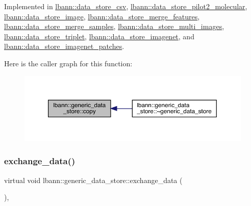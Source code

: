Implemented in \hyperlink{classlbann_1_1data__store__csv_a2e95f53f539a838e6c6484b9f4de5a45}{lbann\+::data\+\_\+store\+\_\+csv}, \hyperlink{classlbann_1_1data__store__pilot2__molecular_a1a59e48a8c7ca8efe86509e0d9cd1307}{lbann\+::data\+\_\+store\+\_\+pilot2\+\_\+molecular}, \hyperlink{classlbann_1_1data__store__image_ab62efcb2dbe3118bf2815fa5d51fee61}{lbann\+::data\+\_\+store\+\_\+image}, \hyperlink{classlbann_1_1data__store__merge__features_a00a6f7e1f07b5bc65d98c835925d1e08}{lbann\+::data\+\_\+store\+\_\+merge\+\_\+features}, \hyperlink{classlbann_1_1data__store__merge__samples_a37fc606c2347c6c6a24b588665e3cde5}{lbann\+::data\+\_\+store\+\_\+merge\+\_\+samples}, \hyperlink{classlbann_1_1data__store__multi__images_a1046efda9448bab9b42e9fcdf71e03f1}{lbann\+::data\+\_\+store\+\_\+multi\+\_\+images}, \hyperlink{classlbann_1_1data__store__triplet_a446ee3b1fa3097e51bd0e198de960cd4}{lbann\+::data\+\_\+store\+\_\+triplet}, \hyperlink{classlbann_1_1data__store__imagenet_ae3b0d31ac020c36f41766999288e2d25}{lbann\+::data\+\_\+store\+\_\+imagenet}, and \hyperlink{classlbann_1_1data__store__imagenet__patches_a5067e8299f5cf073497a5005ee9db759}{lbann\+::data\+\_\+store\+\_\+imagenet\+\_\+patches}.

Here is the caller graph for this function\+:\nopagebreak
\begin{figure}[H]
\begin{center}
\leavevmode
\includegraphics[width=350pt]{classlbann_1_1generic__data__store_ae06e089790aa023b839be508a3c020c6_icgraph}
\end{center}
\end{figure}
\mbox{\label{classlbann_1_1generic__data__store_a5a34663fbbc3714d45743a6ca7195f51}} 
\subsubsection{\texorpdfstring{exchange\+\_\+data()}{exchange\_data()}}
{\footnotesize\ttfamily virtual void lbann\+::generic\+\_\+data\+\_\+store\+::exchange\+\_\+data (\begin{DoxyParamCaption}{ }\end{DoxyParamCaption})\hspace{0.3cm}{\ttfamily [protected]}, {}}



